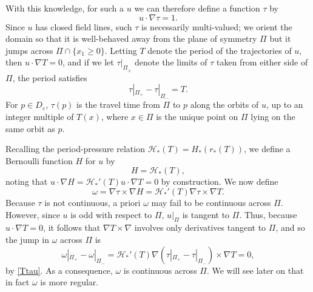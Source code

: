 \documentclass[11pt]{article}
\newcommand{\Red}{}
\renewcommand{\Red}[1]{{\color{red} #1}}
\theoremstyle{plain}
\numberwithin{equation}{section}
\theoremstyle{remark}
\newcommand{\ve}{{\varepsilon}}
\begin{document}
With this knowledge, for such a $u$ we can therefore define a function $\tau$ by
\begin{equation}
  \label{}
    u\cdot \nabla \tau = 1.
\end{equation}
Since $u$ has closed field lines, such $\tau$ is necessarily multi-valued; we orient
the domain so that 
it is well-behaved away from the plane of symmetry $\Pi$ but it jumps across $\Pi\cap \{x_1\geq 0\}$.
Letting $T$ denote the period of the trajectories of $u$, then $u\cdot \nabla T = 0$,
and
if we let
$\tau|_{\Pi_{\pm}}$ denote the limits of $\tau$ taken from
either side of $\Pi$, the period satisfies
\begin{equation}
  \label{Ttau}
  \tau|_{\Pi_+} - \tau|_{\Pi_-} = T.
\end{equation}
For $p \in D_\ve$, $\tau(p)$ is the travel time from $\Pi$ to $p$ along
the orbits of $u$, up to an integer multiple of $T(x)$, where
$x \in \Pi$ is the unique point on $\Pi$ lying on the same orbit
as $p$.

Recalling the period-pressure relation $\mathcal{H}_*(T) = H_*(r_*(T))$, 
we define a Bernoulli function $H$ for $u$ by
\begin{equation}
  \label{qdef}
  H = \mathcal{H}_*(T),
\end{equation}
noting that
$u\cdot \nabla H = \mathcal{H}_*'(T) u\cdot \nabla T = 0$ by construction. We now define
\begin{equation}
  \label{omegadef}
  \omega = \nabla \tau \times \nabla H = \mathcal{H}_*'(T) \nabla \tau \times \nabla T.
\end{equation}
Because
$\tau$ is not continuous, a priori $\omega$ may fail
to be continuous across $\Pi$.
However, since $u$ is odd with respect to $\Pi$, $u|_{\Pi}$ is tangent
to $\Pi$. Thus, because $u \cdot \nabla T = 0$, it follows that
$\nabla T \times \nabla$ involves
only derivatives tangent to $\Pi$, and so the jump in
$\omega$ across $\Pi$ is
\begin{equation}
  \label{}
  \omega|_{\Pi_+} - \omega|_{\Pi_-} 
  = \mathcal{H}_*'(T)  \nabla (\tau|_{\Pi_+} - \tau|_{\Pi_-}) \times \nabla T = 0,
\end{equation}
by \eqref{Ttau}. As a consequence, $\omega$ is continuous across $\Pi$.
We will see later on that in fact $\omega$ is more regular.
\end{document}
